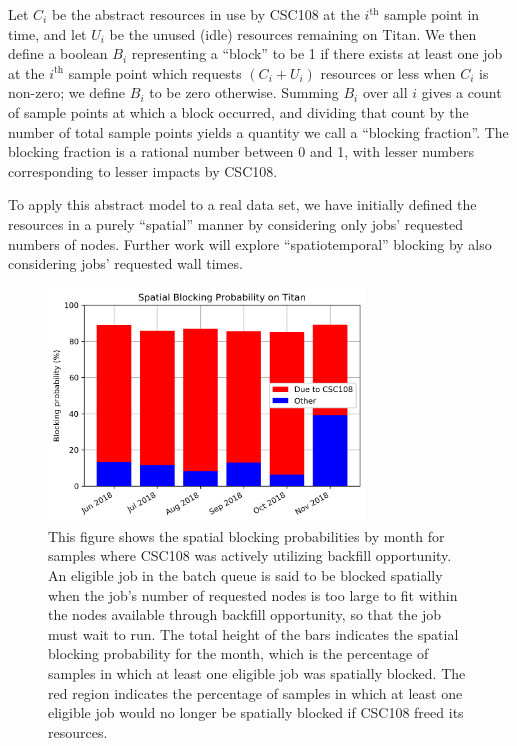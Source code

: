 Let $C_i$ be the abstract resources in use by CSC108 at the $i^{\text{th}}$
sample point in time, and let $U_i$ be the unused (idle) resources remaining on
Titan. We then define a boolean $B_i$ representing a ``block'' to be 1 if there
exists at least one job at the $i^{\text{th}}$ sample point which requests
$(C_i + U_i)$ resources or less when $C_i$ is non-zero; we define $B_i$ to be
zero otherwise. Summing $B_i$ over all $i$ gives a count of sample points at
which a block occurred, and dividing that count by the number of total sample
points yields a quantity we call a ``blocking fraction''. The blocking fraction
is a rational number between 0 and 1, with lesser numbers corresponding to
lesser impacts by CSC108.

To apply this abstract model to a real data set, we have initially defined the
resources in a purely ``spatial'' manner by considering only jobs' requested
numbers of nodes. Further work will explore ``spatiotemporal'' blocking by also
considering jobs' requested wall times.


\begin{figure}
  \includegraphics[width=0.75\textwidth]{images/barplot-spatial-blocking-by-month.png}
\caption{This figure shows the spatial blocking probabilities by month for
samples where CSC108 was actively utilizing backfill opportunity. An eligible
job in the batch queue is said to be blocked spatially when the job's number of
requested nodes is too large to fit within the nodes available through backfill
opportunity, so that the job must wait to run. The total height of the bars
indicates the spatial blocking probability for the month, which is the
percentage of samples in which at least one eligible job was spatially blocked.
The red region indicates the percentage of samples in which at least one
eligible job would no longer be spatially blocked if CSC108 freed its
resources.}
\label{fig:spatial-blocking-by-month}
\end{figure}



